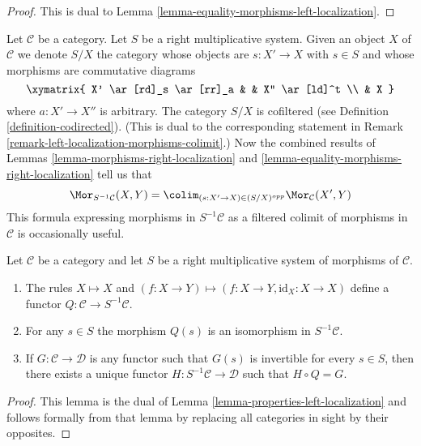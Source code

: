 \begin{proof}
This is dual to
Lemma \ref{lemma-equality-morphisms-left-localization}.
\end{proof}

\begin{remark}
\label{remark-right-localization-morphisms-colimit}
Let $\mathcal{C}$ be a category. Let $S$ be a right multiplicative system.
Given an object $X$ of $\mathcal{C}$ we denote $S/X$ the category whose
objects are $s : X' \to X$ with $s \in S$ and whose morphisms are
commutative diagrams
$$
\xymatrix{
X' \ar[rd]_s \ar[rr]_a & & X'' \ar[ld]^t \\
& X
}
$$
where $a : X' \to X''$ is arbitrary. The category
$S/X$ is cofiltered (see
Definition \ref{definition-codirected}).
(This is dual to the corresponding statement in
Remark \ref{remark-left-localization-morphisms-colimit}.)
Now the combined results of
Lemmas \ref{lemma-morphisms-right-localization} and
\ref{lemma-equality-morphisms-right-localization}
tell us that
\begin{equation}
\label{equation-right-localization-morphisms-colimit}
\Mor_{S^{-1}\mathcal{C}}(X, Y) =
\colim_{(s : X' \to X) \in (S/X)^{opp}} \Mor_\mathcal{C}(X', Y)
\end{equation}
This formula expressing morphisms in $S^{-1}\mathcal{C}$ as a filtered
colimit of morphisms in $\mathcal{C}$ is occasionally useful.
\end{remark}

\begin{lemma}
\label{lemma-properties-right-localization}
Let $\mathcal{C}$ be a category and let $S$ be a right multiplicative
system of morphisms of $\mathcal{C}$.
\begin{enumerate}
\item The rules $X \mapsto X$ and
$(f : X \to Y) \mapsto (f : X \to Y, \text{id}_X : X \to X)$
define a functor $Q : \mathcal{C} \to S^{-1}\mathcal{C}$.
\item For any $s \in S$ the morphism $Q(s)$ is an isomorphism in
$S^{-1}\mathcal{C}$.
\item If $G : \mathcal{C} \to \mathcal{D}$ is any functor such that
$G(s)$ is invertible for every $s \in S$, then there exists a
unique functor $H : S^{-1}\mathcal{C} \to \mathcal{D}$
such that $H \circ Q = G$.
\end{enumerate}
\end{lemma}

\begin{proof}
This lemma is the dual of
Lemma \ref{lemma-properties-left-localization}
and follows formally from that lemma by replacing all
categories in sight by their opposites.
\end{proof}

